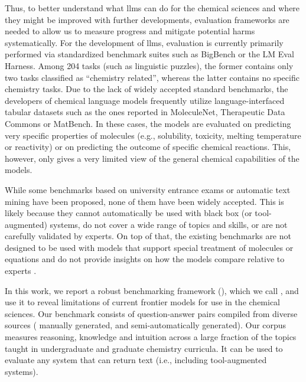 \documentclass[11pt, oneside]{article}
\begin{document}
\begin{refsegment}
Thus, to better understand what \glspl{llm} can do for the chemical sciences and where they might be improved with further developments, evaluation frameworks are needed to allow us to measure progress and mitigate potential harms systematically.
For the development of \glspl{llm}, evaluation is currently primarily performed via standardized benchmark suites such as BigBench\autocite{srivastava2022beyond} or the LM Eval Harness.\autocite{eval-harness}
Among 204 tasks (such as linguistic puzzles), the former contains only two tasks classified as \enquote{chemistry related}, whereas the latter contains no specific chemistry tasks.
Due to the lack of widely accepted standard benchmarks, the developers of chemical language models\autocite{jablonka2024leveraging, guo2023large, ahmad2022chemberta2, Cai_2024, frey2023neural} frequently utilize language-interfaced\autocite{dinh2022lift} tabular datasets such as the ones reported in MoleculeNet,\autocite{wu2018moleculenet} Therapeutic Data Commons\autocite{huang2021therapeutics} or MatBench.\autocite{Dunn_2020}
In these cases, the models are evaluated on predicting very specific properties of molecules (e.g., solubility, toxicity, melting temperature or reactivity) or on predicting the outcome of specific chemical reactions.
This, however, only gives a very limited view of the general chemical capabilities of the models.

While some benchmarks based on university entrance exams\autocite{Zaki_2024, arora2023llms} or automatic text mining\autocite{song2023honeybee, wei2021chemistryqa, song-etal-2023-matsci} have been proposed, none of them have been widely accepted.
This is likely because they cannot automatically be used with black box (or tool-augmented) systems, do not cover a wide range of topics and skills, or are not carefully validated by experts.
On top of that, the existing benchmarks are not designed to be used with models that support special treatment of molecules or equations and do not provide insights on how the models compare relative to experts \autocite{wu2018moleculenet}.

In this work, we report a robust benchmarking framework  (), which we call \chembench, and use it to reveal limitations of current frontier models for use in the chemical sciences.
Our benchmark consists of \xspace question-answer pairs compiled from diverse sources (\xspace manually generated, and \xspace semi-automatically generated).
Our corpus measures reasoning, knowledge and intuition across a large fraction of the topics taught in undergraduate and graduate chemistry curricula. It can be used to evaluate any system that can return text (i.e., including tool-augmented systems).


\end{refsegment}
\end{document}
